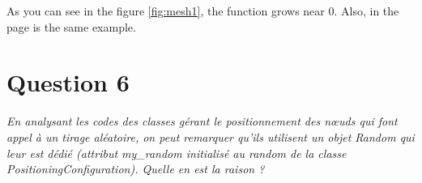 \documentclass[11pt,a4paper,sans]{report}
\begin{document}
\par As you can see in the figure \ref{fig:mesh1}, the 
function grows near 0. Also, in the page \pageref{fig:mesh1} 
is the same example.

\section{Question 6}
\textit{En analysant les codes des classes gérant le positionnement des nœuds qui font appel à un tirage aléatoire, on peut remarquer qu’ils utilisent un objet Random qui leur est dédié (attribut my\_random initialisé au random de la classe PositioningConfiguration).  Quelle en est la raison ?}
\end{document}
